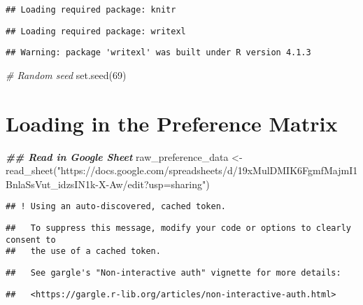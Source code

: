 \documentclass[
]{article}
\newenvironment{Shaded}{\begin{snugshade}}{\end{snugshade}}
\newcommand{\CommentTok}[1]{\textcolor[rgb]{0.56,0.35,0.01}{\textit{#1}}}
\newcommand{\DecValTok}[1]{\textcolor[rgb]{0.00,0.00,0.81}{#1}}
\newcommand{\DocumentationTok}[1]{\textcolor[rgb]{0.56,0.35,0.01}{\textbf{\textit{#1}}}}
\newcommand{\FunctionTok}[1]{\textcolor[rgb]{0.00,0.00,0.00}{#1}}
\newcommand{\NormalTok}[1]{#1}
\newcommand{\OtherTok}[1]{\textcolor[rgb]{0.56,0.35,0.01}{#1}}
\newcommand{\StringTok}[1]{\textcolor[rgb]{0.31,0.60,0.02}{#1}}
\begin{document}
\begin{verbatim}
## Loading required package: knitr
\end{verbatim}

\begin{verbatim}
## Loading required package: writexl
\end{verbatim}

\begin{verbatim}
## Warning: package 'writexl' was built under R version 4.1.3
\end{verbatim}

\begin{Shaded}
\begin{Highlighting}[]
\CommentTok{\# Random seed}
\FunctionTok{set.seed}\NormalTok{(}\DecValTok{69}\NormalTok{)}
\end{Highlighting}
\end{Shaded}

\hypertarget{loading-in-the-preference-matrix}{%
\section{Loading in the Preference
Matrix}\label{loading-in-the-preference-matrix}}

\begin{Shaded}
\begin{Highlighting}[]
\DocumentationTok{\#\# Read in Google Sheet}
\NormalTok{raw\_preference\_data }\OtherTok{\textless{}{-}} \FunctionTok{read\_sheet}\NormalTok{(}\StringTok{"https://docs.google.com/spreadsheets/d/19xMulDMIK6FgmfMajmI1BnlaSsVut\_idzsIN1k{-}X{-}Aw/edit?usp=sharing"}\NormalTok{)}
\end{Highlighting}
\end{Shaded}

\begin{verbatim}
## ! Using an auto-discovered, cached token.
\end{verbatim}

\begin{verbatim}
##   To suppress this message, modify your code or options to clearly consent to
##   the use of a cached token.
\end{verbatim}

\begin{verbatim}
##   See gargle's "Non-interactive auth" vignette for more details:
\end{verbatim}

\begin{verbatim}
##   <https://gargle.r-lib.org/articles/non-interactive-auth.html>
\end{verbatim}
\end{document}
